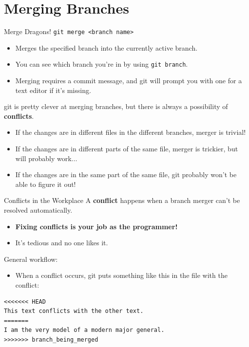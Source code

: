 \documentclass[11pt]{beamer}
\begin{document}
\section[Merging]{Merging Branches}
\begin{frame}{Merge Dragons!}
\texttt{git merge <branch name>} 
\begin{itemize}
\item Merges the specified branch into the currently active branch.
\item You can see which branch you're in by using \texttt{git branch}.
\item Merging requires a commit message, and git will prompt you with one for a text editor if it's missing. 
\end{itemize}
git is pretty clever at merging branches, but there is always a possibility of \textbf{conflicts}.
\begin{itemize}
\item If the changes are in different files in the different branches, merger is trivial! 
\item If the changes are in different parts of the same file, merger is trickier, but will probably work...
\item If the changes are in the same part of the same file, git probably won't be able to figure it out! 
\end{itemize}
\end{frame}

\begin{frame}[fragile=singleslide]{Conflicts in the Workplace}
A \textbf{conflict} happens when a branch merger can't be resolved  automatically.  
\begin{itemize}
\item \textbf{Fixing conflicts is your job as the programmer!}
\item It's tedious and no one likes it.
\end{itemize}
General workflow:
\begin{itemize}
\item When a conflict occurs, git puts something like this in the file with the conflict:
\end{itemize}
\begin{lstlisting}
<<<<<<< HEAD
This text conflicts with the other text.
=======
I am the very model of a modern major general.
>>>>>>> branch_being_merged
\end{lstlisting}
\end{frame}
\end{document}
